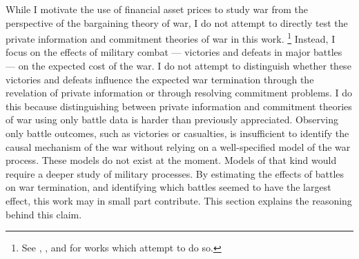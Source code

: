 While I motivate the use of financial asset prices to study war from the perspective of the bargaining theory of war, I do not attempt to directly test the private information and commitment theories of war in this work.%
\footnote{See \textcite{Ramsay2008}, \textcite{Weisiger2015}, and \textcite{Reiter2009} for works which attempt to do so.}
Instead, I focus on the effects of military combat --- victories and defeats in major battles --- on the expected cost of the war.
I do not attempt to distinguish whether these victories and defeats influence the expected war termination through the revelation of private information or through resolving commitment problems.
I do this because distinguishing between private information and commitment theories of war using only battle data is harder than previously appreciated.
Observing only battle outcomes, such as victories or casualties, is insufficient to identify the causal mechanism of the war without relying on a well-specified model of the war process. 
These models do not exist at the moment.
Models of that kind would require a deeper study of military processes.
By estimating the effects of battles on war termination, and identifying which battles seemed to have the largest effect, this work may in small part contribute.
This section explains the reasoning behind this claim.

